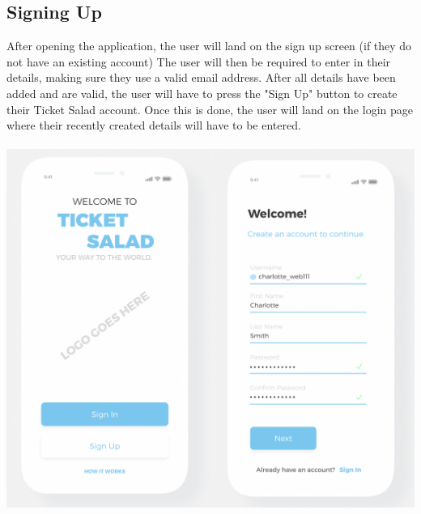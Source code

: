 \documentclass[11pt]{article}
\begin{document}
	\subsection{Signing Up}
	After opening the application, the user will land on the sign up screen (if they do not have an existing 		account) The user will then be required to enter in their details, making sure they use a valid email
	address. After all details have been added and are valid, the user will have to press the "Sign Up" button to 	create their Ticket Salad account. Once this is done, the user will land on the login page where their recently
	created details will have to be entered.
	\\
	\\
	\includegraphics[width=\linewidth]{signup.png}
	\pagebreak
\end{document}
